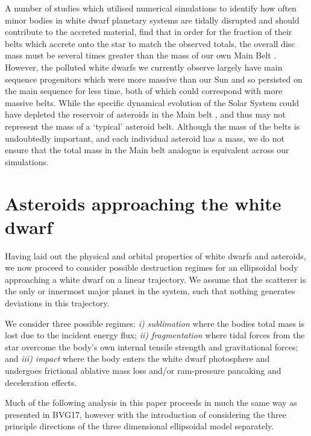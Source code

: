 \documentclass[fleqn,usenatbib]{mnras}
\begin{document}
A number of studies which utilised numerical simulations to identify how often minor bodies in white dwarf planetary systems are tidally disrupted and should contribute to the accreted material, find that in order for the fraction of their belts which accrete onto the star to match the observed totals, the overall disc mass must be several times greater than the mass of our own Main Belt \citep{Debes2012, Frewen2014}.
However, the polluted white dwarfs we currently observe largely have main sequence progenitors which were more massive than our Sun \citep{Tremblay2016, Cummings2018, ElBadry2018, McCleery2020, BarrientosChaname2021} and so persisted on the main sequence for less time, both of which could correspond with more massive belts.
While the specific dynamical evolution of the Solar System could have depleted the reservoir of asteroids in the Main belt \citep{Walsh2011}, and thus may not represent the mass of a `typical' asteroid belt.
Although the mass of the belts is undoubtedly important, and each individual asteroid has a mass, we do not ensure that the total mass in the Main belt analogue is equivalent across our simulations. 

\section{Asteroids approaching the white dwarf} \label{sec:approach}

Having laid out the physical and orbital properties of white dwarfs and asteroids, we now proceed to consider possible destruction regimes for an ellipsoidal body approaching a white dwarf on a linear trajectory. We assume that the scatterer is the only or innermost major planet in the system, such that nothing generates deviations in this trajectory.

We consider three possible regimes: \textit{i) sublimation} where the bodies total mass is lost due to the incident energy flux; \textit{ii) fragmentation} where tidal forces from the star overcome the body's own internal tensile strength and gravitational forces; and \textit{iii) impact} where the body enters the white dwarf photosphere and undergoes frictional ablative mass loss and/or ram-pressure pancaking and deceleration effects.


Much of the following analysis in this paper proceeds in much the same way as presented in BVG17, however with the introduction of considering the three principle directions of the three dimensional ellipsoidal model separately.
\end{document}
